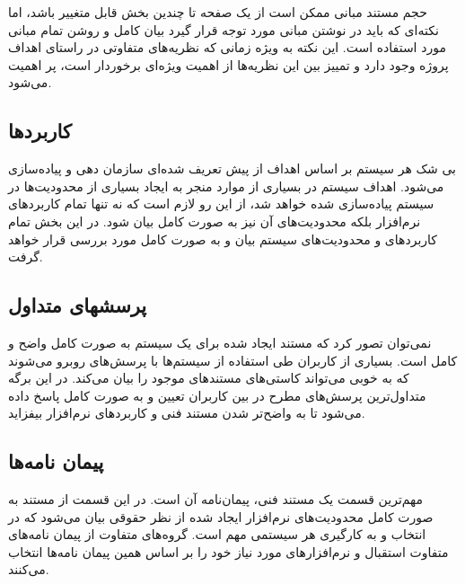 حجم مستند مبانی ممکن است از یک صفحه تا چندین بخش قابل متغییر باشد، اما نکته‌ای که باید در نوشتن
مبانی مورد توجه قرار گیرد بیان کامل و روشن تمام مبانی مورد استفاده است. این نکته به ویژه زمانی
که نظریه‌های متفاوتی در راستای اهداف پروژه وجود دارد و تمییز بین این نظریه‌ها از اهمیت
ویژه‌ای برخوردار است، پر اهمیت می‌شود.
  
\subsection{کاربردها}
بی شک هر سیستم بر اساس اهداف از پیش تعریف شده‌ای سازمان دهی و پیاده‌سازی می‌شود. اهداف سیستم 
در بسیاری از موارد منجر به ایجاد بسیاری از محدودیت‌ها در سیستم پیاده‌سازی شده خواهد شد، از این
رو لازم است که نه تنها تمام کاربردهای نرم‌افزار بلکه محدودیت‌های آن نیز به صورت کامل بیان شود.
در این بخش تمام کاربردهای و محدودیت‌های سیستم بیان و به صورت کامل مورد بررسی قرار خواهد گرفت.
  
\subsection{پرسشهای متداول}
نمی‌توان تصور کرد که مستند ایجاد شده برای یک سیستم به صورت کامل واضح و کامل است. بسیاری از کاربران
طی استفاده از سیستم‌ها با پرسش‌های روبرو می‌شوند که به خوبی می‌تواند کاستی‌های مستندهای موجود را بیان 
می‌کند. در این برگه متداول‌ترین پرسش‌های مطرح در بین کاربران تعیین و به صورت کامل پاسخ داده می‌شود
تا به واضح‌تر شدن مستند فنی و کاربردهای نرم‌افزار بیفزاید.
  
\subsection{پیمان نامه‌ها}
مهم‌ترین قسمت یک مستند فنی، پیمان‌نامه آن است. در این قسمت از مستند به صورت کامل محدودیت‌های نرم‌افزار
ایجاد شده از نظر حقوقی بیان می‌شود که در انتخاب و به کارگیری هر سیستمی مهم است. گروه‌های متفاوت
از پیمان نامه‌های متفاوت استقبال و نرم‌افزارهای مورد نیاز خود را بر اساس همین پیمان نامه‌ها 
انتخاب می‌کنند.
  

